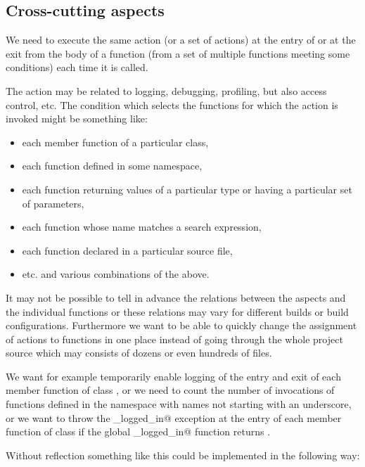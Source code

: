 \subsection{Cross-cutting aspects}

We need to execute the same action (or a set of actions) at the entry of or at the exit from the body of
a function (from a set of multiple functions meeting some conditions) each time it is called.

The action may be related to logging, debugging, profiling, but also access control, etc.
The condition which selects the functions for which the action is invoked might be something like:
\begin{itemize}
\item each member function of a particular class,
\item each function defined in some namespace,
\item each function returning values of a particular type or having a particular set of parameters,
\item each function whose name matches a search expression,
\item each function declared in a particular source file,
\item etc. and various combinations of the above.
\end{itemize}

It may not be possible to tell in advance the relations between the aspects and the individual functions
or these relations may vary for different builds or build configurations.
Furthermore we want to be able to quickly change the assignment of actions to functions in one
place instead of going through the whole project source which may consists of dozens or even hundreds of files.

We want for example temporarily enable logging of the entry and exit of each member function of class \verb@foo@,
or we need to count the number of invocations of functions defined in the \verb@bar@ namespace with
names not starting with an underscore, or we want to throw the \verb@not_logged_in@ exception at the entry
of each member function of class \verb@secure@ if the global \verb@user_logged_in@ function returns \verb@false@.

Without reflection something like this could be implemented in the following way:

